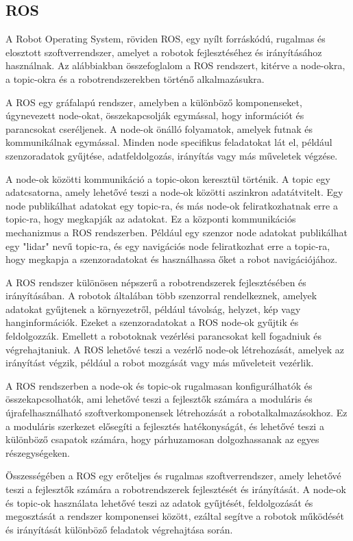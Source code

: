 \subsection{ROS}
A Robot Operating System, röviden ROS, egy nyílt forráskódú, rugalmas és elosztott szoftverrendszer, amelyet a robotok fejlesztéséhez és irányításához használnak. Az alábbiakban összefoglalom a ROS rendszert, kitérve a node-okra, a topic-okra és a robotrendszerekben történő alkalmazásukra.

A ROS egy gráfalapú rendszer, amelyben a különböző komponenseket, úgynevezett node-okat, összekapcsolják egymással, hogy információt és parancsokat cseréljenek. A node-ok önálló folyamatok, amelyek futnak és kommunikálnak egymással. Minden node specifikus feladatokat lát el, például szenzoradatok gyűjtése, adatfeldolgozás, irányítás vagy más műveletek végzése.

A node-ok közötti kommunikáció a topic-okon keresztül történik. A topic egy adatcsatorna, amely lehetővé teszi a node-ok közötti aszinkron adatátvitelt. Egy node publikálhat adatokat egy topic-ra, és más node-ok feliratkozhatnak erre a topic-ra, hogy megkapják az adatokat. Ez a központi kommunikációs mechanizmus a ROS rendszerben. Például egy szenzor node adatokat publikálhat egy "lidar" nevű topic-ra, és egy navigációs node feliratkozhat erre a topic-ra, hogy megkapja a szenzoradatokat és használhassa őket a robot navigációjához.

A ROS rendszer különösen népszerű a robotrendszerek fejlesztésében és irányításában. A robotok általában több szenzorral rendelkeznek, amelyek adatokat gyűjtenek a környezetről, például távolság, helyzet, kép vagy hanginformációk. Ezeket a szenzoradatokat a ROS node-ok gyűjtik és feldolgozzák. Emellett a robotoknak vezérlési parancsokat kell fogadniuk és végrehajtaniuk. A ROS lehetővé teszi a vezérlő node-ok létrehozását, amelyek az irányítást végzik, például a robot mozgását vagy más műveleteit vezérlik.

A ROS rendszerben a node-ok és topic-ok rugalmasan konfigurálhatók és összekapcsolhatók, ami lehetővé teszi a fejlesztők számára a moduláris és újrafelhasználható szoftverkomponensek létrehozását a robotalkalmazásokhoz. Ez a moduláris szerkezet elősegíti a fejlesztés hatékonyságát, és lehetővé teszi a különböző csapatok számára, hogy párhuzamosan dolgozhassanak az egyes részegységeken.

Összességében a ROS egy erőteljes és rugalmas szoftverrendszer, amely lehetővé teszi a fejlesztők számára a robotrendszerek fejlesztését és irányítását. A node-ok és topic-ok használata lehetővé teszi az adatok gyűjtését, feldolgozását és megosztását a rendszer komponensei között, ezáltal segítve a robotok működését és irányítását különböző feladatok végrehajtása során.

